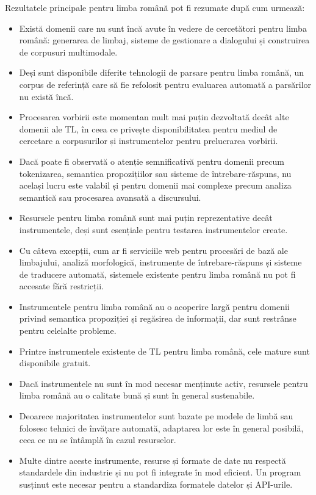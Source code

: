 \begin{multicols}{2}
Rezultatele principale pentru limba română pot fi rezumate după cum urmează:

\begin{itemize}
\item Există domenii care nu sunt încă avute în vedere de cercetători pentru limba română: generarea de limbaj, sisteme de gestionare a dialogului și construirea de corpusuri multimodale.
\item Deși sunt disponibile diferite tehnologii de parsare pentru limba română, un corpus de referință care să fie refolosit pentru evaluarea automată a parsărilor nu există încă.
\item Procesarea vorbirii este momentan mult mai puțin dezvoltată decât alte domenii ale TL, în ceea ce privește disponibilitatea pentru mediul de cercetare a corpusurilor și instrumentelor pentru prelucrarea vorbirii.
\item Dacă poate fi observată o atenție semnificativă pentru domenii precum tokenizarea, semantica propozițiilor sau sisteme de întrebare-răspuns, nu același lucru este valabil și pentru domenii mai complexe precum analiza semantică sau procesarea avansată a discursului.
\item Resursele pentru limba română sunt mai puțin reprezentative decât instrumentele, deși sunt esențiale pentru testarea instrumentelor create. 
\item Cu câteva excepții, cum ar fi serviciile web pentru procesări de bază ale limbajului, analiză morfologică, instrumente de întrebare-răspuns și sisteme de traducere automată, sistemele existente pentru limba română nu pot fi accesate fără restricții. 
\item Instrumentele pentru limba română au o acoperire largă pentru domenii privind semantica propoziției și regăsirea de informații, dar sunt restrânse pentru celelalte probleme.
\item Printre instrumentele existente de TL pentru limba română, cele mature sunt disponibile gratuit.
\item Dacă instrumentele nu sunt în mod necesar menținute activ, resursele pentru limba română au o calitate bună și sunt în general sustenabile.
\item Deoarece majoritatea instrumentelor sunt bazate pe modele de limbă sau folosesc tehnici de învățare automată, adaptarea lor este în general posibilă, ceea ce nu se întâmplă în cazul resurselor.
\item Multe dintre aceste instrumente, resurse și formate de date nu respectă standardele din industrie și nu pot fi integrate în mod eficient. Un program susținut este necesar pentru a standardiza formatele datelor și API-urile.\vspace*{-0.15 cm}

\end{itemize}
\end{multicols}
